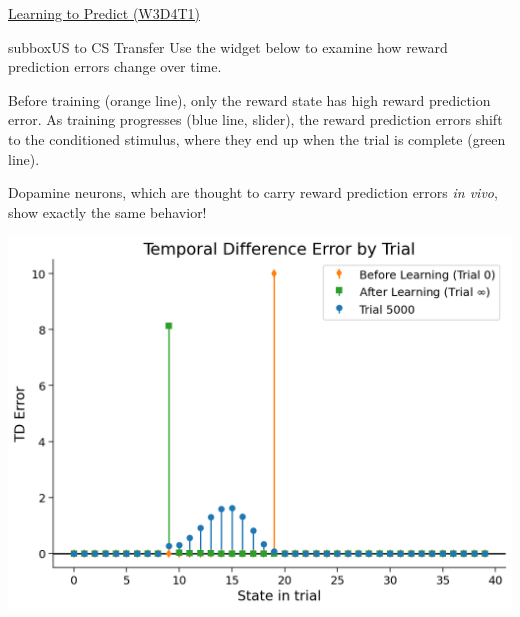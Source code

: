 \begin{textbox}{\href{https://compneuro.neuromatch.io/tutorials/W3D4_ReinforcementLearning/student/W3D4_Tutorial1.html}{Learning to Predict (W3D4T1)} }
\begin{subbox}{subbox}{US to CS Transfer }
Use the widget below to examine how reward prediction errors change over time. 


Before training (orange line), only the reward state has high reward prediction error. As training progresses (blue line, slider), the reward prediction errors shift to the conditioned stimulus, where they end up when the trial is complete (green line). 

Dopamine neurons, which are thought to carry reward prediction errors \textit{in vivo}, show exactly the same behavior!
\begin{center}
    
\includegraphics[scale=0.15]{Figures/RL/RL_Figure2.png}
\end{center}

\end{subbox}
\end{textbox}
